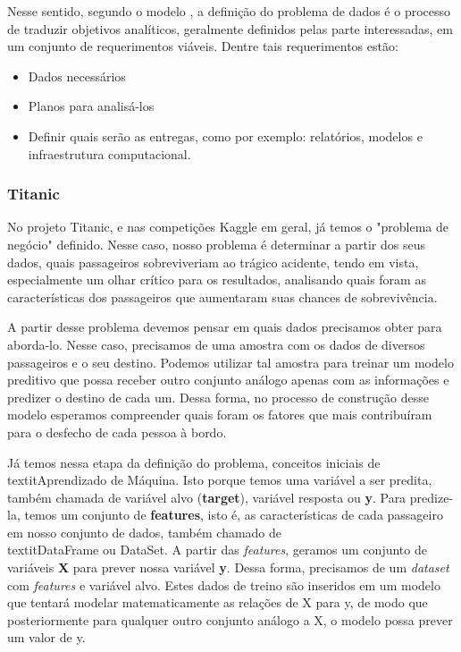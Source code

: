 Nesse sentido, segundo o modelo \cite{BATON}, a definição do problema de dados é o processo de traduzir objetivos analíticos, geralmente definidos pelas parte interessadas, em um conjunto de requerimentos viáveis. Dentre tais requerimentos estão:
\begin{itemize}
\item Dados necessários
\item Planos para analisá-los
\item Definir quais serão as entregas, como por exemplo: relatórios, modelos e infraestrutura computacional. 
\end{itemize}

\subsubsection{Titanic}

No projeto Titanic, e nas competições Kaggle em geral, já temos o "problema de negócio" definido. Nesse caso, nosso problema é determinar a partir dos seus dados, quais passageiros sobreviveriam ao trágico acidente, tendo em vista, especialmente um olhar crítico para os resultados, analisando quais foram as características dos passageiros que aumentaram suas chances de sobrevivência.

A partir desse problema devemos pensar em quais dados precisamos obter para aborda-lo. Nesse caso, precisamos de uma amostra com os dados de diversos passageiros e o seu destino. Podemos utilizar tal amostra para treinar um modelo preditivo que possa receber outro conjunto análogo apenas com as informações e predizer o destino de cada um. Dessa forma, no processo de construção desse modelo esperamos compreender quais foram os fatores que mais contribuíram para o desfecho de cada pessoa à bordo. 

Já temos nessa etapa da definição do problema, conceitos iniciais de \\textit{Aprendizado de Máquina}. Isto porque temos uma variável a ser predita, também chamada de variável alvo (\textbf{target}), variável resposta ou \textbf{y}. 
Para predize-la, temos um conjunto de \textbf{features}, isto é, as características de cada passageiro em nosso conjunto de dados, também chamado de \\textit{DataFrame ou DataSet}. A partir das \emph{features}, geramos um conjunto de variáveis \textbf{X} para prever nossa variável \textbf{y}. 
Dessa forma, precisamos de um \emph{dataset} com \emph{features} e variável alvo. 
Estes dados de treino são inseridos em um modelo que tentará modelar matematicamente as relações de X para y, de modo que posteriormente para qualquer outro conjunto análogo a X, o modelo possa prever um valor de y. 


